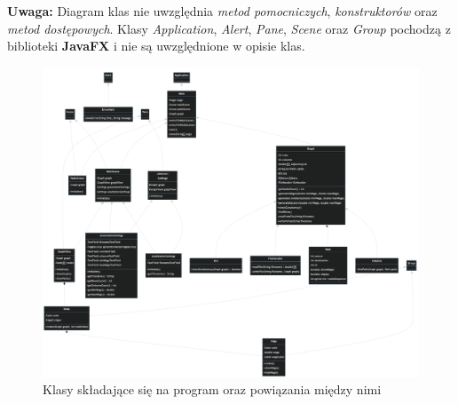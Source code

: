 \documentclass{article}
\begin{document}
\medskip

\noindent\textbf{Uwaga:} Diagram klas nie uwzględnia \emph{metod pomocniczych}, \emph{konstruktorów} \linebreak oraz \emph{metod dostępowych}. Klasy \emph{Application}, \emph{Alert}, \emph{Pane}, \emph{Scene} oraz \emph{Group} pochodzą z biblioteki \textbf{JavaFX} i nie są uwzględnione w opisie klas.
\begin{figure}[htp]
        \centering
        \includegraphics[width=15cm]{images/class_diagram.png}
        \caption{Klasy składające się na program oraz powiązania między nimi}
        \label{fig:class_diagram}
\end{figure}

\newpage
\end{document}
